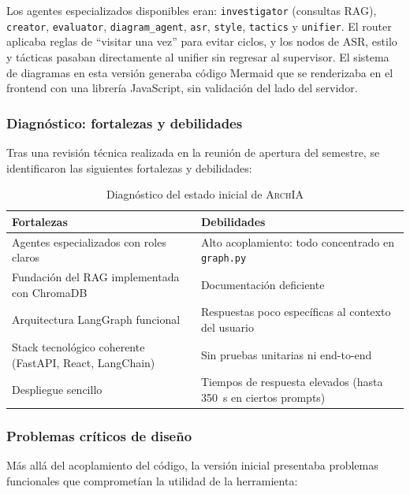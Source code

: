 \documentclass[12pt, letterpaper, oneside]{article}
\newcommand{\archia}{\textsc{ArchIA}}
\begin{document}
Los agentes especializados disponibles eran: \texttt{investigator} (consultas RAG),
\texttt{creator}, \texttt{evaluator}, \texttt{diagram\_agent}, \texttt{asr},
\texttt{style}, \texttt{tactics} y \texttt{unifier}. El router aplicaba reglas
de ``visitar una vez'' para evitar ciclos, y los nodos de ASR, estilo y tácticas
pasaban directamente al unifier sin regresar al supervisor. El sistema de diagramas en esta versión generaba código Mermaid que se renderizaba
en el frontend con una librería JavaScript, sin validación del lado del servidor.

\subsubsection{Diagnóstico: fortalezas y debilidades}

Tras una revisión técnica realizada en la reunión de apertura del semestre, se
identificaron las siguientes fortalezas y debilidades:

\begin{table}[H]
\centering
\fontsize{10}{11}\selectfont
\caption{Diagnóstico del estado inicial de \archia{}}
\label{tab:diagnostico-inicial}
\begin{tabularx}{\textwidth}{>{\raggedright\arraybackslash}X >{\raggedright\arraybackslash}X}
\toprule
\textbf{Fortalezas} & \textbf{Debilidades} \\
\midrule
Agentes especializados con roles claros &
Alto acoplamiento: todo concentrado en \texttt{graph.py} \\
Fundación del RAG implementada con ChromaDB &
Documentación deficiente \\
Arquitectura LangGraph funcional &
Respuestas poco específicas al contexto del usuario \\
Stack tecnológico coherente (FastAPI, React, LangChain) &
Sin pruebas unitarias ni end-to-end \\
Despliegue sencillo &
Tiempos de respuesta elevados (hasta 350~s en ciertos prompts) \\
\bottomrule
\end{tabularx}
\end{table}

\subsubsection{Problemas críticos de diseño}

Más allá del acoplamiento del código, la versión inicial presentaba problemas
funcionales que comprometían la utilidad de la herramienta:
\end{document}

